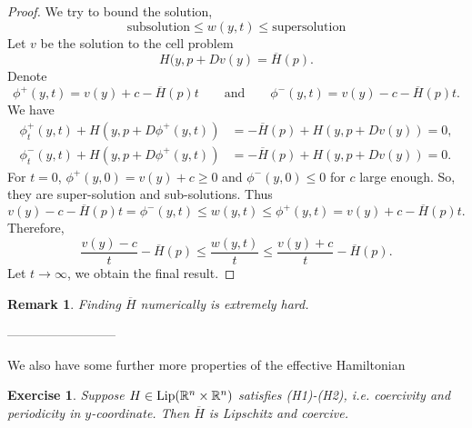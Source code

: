 \documentclass[12pt, oneside]{amsart}  	%
\newtheorem{remark}{Remark}
\newtheorem{exercise}{Exercise}
\begin{document}
\begin{proof}
We try to bound the solution,
$$\text{subsolution} \le w(y,t) \le \text{supersolution}$$
Let $v$ be the solution to the cell problem
$$H(y, p+ Dv(y) = \overline{H}(p).$$
Denote
\begin{equation*}
\phi^+(y,t)=v(y) + c -\overline{H}(p)t\qquad\text{and}\qquad\phi^-(y,t)=v(y) - c -\overline{H}(p)t.
\end{equation*}
We have
\begin{align*}
\phi^+_t(y,t) + H(y, p + D\phi^+(y,t))&= -\overline{H}(p) + H(y, p + Dv(y))=0,\\
\phi^-_t(y,t) + H(y, p + D\phi^+(y,t))&= -\overline{H}(p) + H(y, p + Dv(y))=0.
\end{align*}
For $t=0$, $\phi^+(y,0)=v(y)+c \ge 0$ and $\phi^-(y,0)\le 0$ for $c$ large enough. So, they are super-solution and sub-solutions. Thus
$$v(y)-c-\overline{H}(p)t = \phi^-(y,t) \le w(y,t) \le \phi^+(y,t) = v(y) + c -\overline{H}(p)t.$$
Therefore,
$$\frac{v(y)-c}{t}-\overline{H}(p)\le \frac{w(y,t)}{t} \le\frac{v(y)+c}{t}-\overline{H}(p).$$
Let $t\longrightarrow \infty$, we obtain the final result.
\end{proof}
\begin{remark}
Finding $\overline{H}$ numerically is extremely hard.
\end{remark}
--------------------------

We also have some further more properties of the effective Hamiltonian

\begin{exercise} \label{exercise4}
Suppose $H\in\text{Lip}(\mathbb{R}^n\times\mathbb{R}^n)$ satisfies (H1)-(H2), i.e. coercivity and periodicity in $y$-coordinate. Then $\overline{H}$ is Lipschitz and coercive.
\end{exercise}











\end{document}
